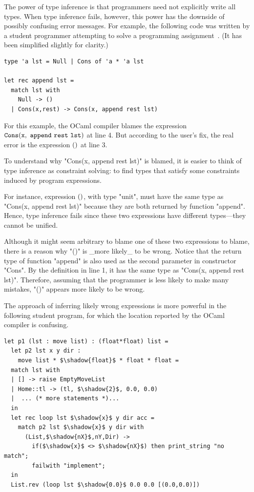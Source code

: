 The power of type inference is that programmers need not
explicitly write all types. When type inference fails, however,
this power has the downside of possibly confusing error messages.
For example, the following code was written by a student
programmer attempting to solve a programming
assignment~\cite{lerner:pldi07}. (It has been simplified slightly
for clarity.)

\lstset{numbers=left, xleftmargin=15pt, framexleftmargin=15pt}
\begin{lstlisting}
type 'a lst = Null | Cons of 'a * 'a lst

let rec append lst =
  match lst with
    Null -> ()
  | Cons(x,rest) -> Cons(x, append rest lst)
\end{lstlisting}

For this example, the OCaml compiler blames the expression
$\mathtt{Cons(x,\ append\ rest\ lst)}$ at line 4. But
according to the user's fix, the real error is the expression
$\mathtt{()}$ at line 3.

To understand why "Cons(x, append rest lst)" is blamed, it
is easier to think of type inference as constraint solving: to find types
that satisfy some constraints induced by program expressions.

For instance, expression $\mathtt{(})$, with type "unit", must have the
same type as "Cons(x, append rest lst)" because they are both
returned by function "append". Hence, type inference fails since these two expressions have different types---they cannot
be unified.

Although it might seem arbitrary to blame one of these two expressions to
blame, there is a reason why "()" is _more likely_ to be wrong.
Notice that the return type of function "append" is also
used as the second parameter in constructor "Cons".  By the
definition in line 1, it has the same type as "Cons(x, append rest lst)".
Therefore, assuming that the programmer is less likely to make many
mistakes, "()" appears more likely to be wrong.

The approach of inferring likely wrong expressions is more powerful in
the following student program, for which the location reported by the
OCaml compiler is confusing.

\begin{lstlisting}
let p1 (lst : move list) : (float*float) list = 
  let p2 lst x y dir : 
    move list * $\shadow{float}$ * float * float = 
  match lst with
  | [] -> raise EmptyMoveList
  | Home::tl -> (tl, $\shadow{2}$, 0.0, 0.0)
  |  ... (* more statements *)... 
  in
  let rec loop lst $\shadow{x}$ y dir acc =
    match p2 lst $\shadow{x}$ y dir with
      (List,$\shadow{nX}$,nY,Dir) -> 
        if($\shadow{x}$ <> $\shadow{nX}$) then print_string "no match";
        failwith "implement";
  in 
  List.rev (loop lst $\shadow{0.0}$ 0.0 0.0 [(0.0,0.0)])
\end{lstlisting}

